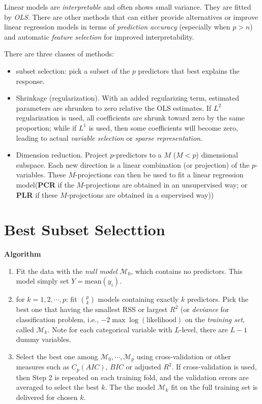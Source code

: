 \documentclass[
  letterpaper,
  DIV=11,
  numbers=noendperiod]{scrreprt}
\providecommand{\tightlist}{%
  \setlength{\itemsep}{0pt}\setlength{\parskip}{0pt}}\usepackage{longtable,booktabs,array}
\begin{document}
Linear models are \emph{interpretable} and often shows small variance.
They are fitted by \emph{OLS}. There are other methods that can either
provide alternatives or improve linear regression models in terms of
\emph{prediction accuracy} (especially when \(p>n\)) and automatic
\emph{feature selection} for improved interpretability.

There are three classes of methods:

\begin{itemize}
\tightlist
\item
  subset selection: pick a subset of the \(p\) predictors that best
  explains the response.
\item
  Shrinkage (regularization). With an added regularizing term, estimated
  parameters are shrunken to zero relative the OLS estimates. If \(L^2\)
  regularization is used, all coefficients are shrunk toward zero by the
  same proportion; while if \(L^1\) is used, then some coefficients will
  become zero, leading to actual \emph{variable selection} or
  \emph{sparse representation}.
\item
  Dimension reduction. Project \(p\)-predictors to a \(M\) (\(M<p\))
  dimensional subspace. Each new direction is a linear combination (or
  projection) of the \(p\)-variables. These \(M\)-projections can then
  be used to fit a linear regression model(\textbf{PCR} if the
  \(M\)-projections are obtained in an unsupervised way; or \textbf{PLR}
  if these \(M\)-projections are obtained in a supervised way))
\end{itemize}

\section{Best Subset Selecttion}\label{best-subset-selecttion}

\textbf{Algorithm}

\begin{enumerate}
\def\labelenumi{\arabic{enumi}.}
\tightlist
\item
  Fit the data with the \emph{null model} \(\mathcal{M}_0\), which
  contains no predictors. This model simply set \(Y=\text{mean}(y_i)\).
\item
  for \(k=1, 2, \cdots, p\): fit \(p \choose k\) models containing
  exactly \(k\) predictors. Pick the best one that having the smallest
  RSS or largest \(R^2\) (or \emph{deviance} for classification problem,
  i.e., \(-2\max \log (\text{likelihood})\) on the \emph{training set},
  called \(\mathcal{M}_k\). Note for each categorical variable with
  \(L\)-level, there are \(L-1\) dummy variables.
\item
  Select the best one among \(\mathcal{M}_0, \cdots, \mathcal{M}_p\)
  using cross-validation or other measures such as \(C_p (AIC)\),
  \(BIC\) or adjusted \(R^2\). If cross-validation is used, then Step 2
  is repeated on each training fold, and the validation errors are
  averaged to select the best \(k\). The the model \(\mathcal{M}_k\) fit
  on the full training set is delivered for chosen \(k\).
\end{enumerate}
\end{document}
